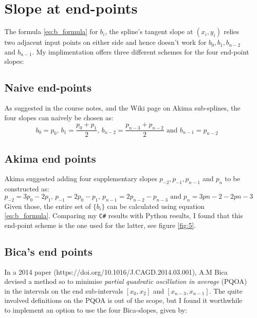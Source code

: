 \documentclass[a4paper]{article}
\begin{document}
\section{Slope at end-points}
The formula \ref{eq:b_formula} for $b_i$, the spline's tangent slope at $(x_i,y_i)$ relies two adjacent input points on either side and hence doesn't work for $b_0, b_1, b_{n-2}$ and $b_{n-1}$. My implimentation offers three different schemes for the four end-point slopes:

\subsection{Naive end-points}
As suggested in the course notes, and the Wiki page on Akima sub-splines, the four slopes can naively be chosen as:
\begin{equation}
    b_0 = p_0,\,b_1 = \frac{p_0 + p_1}{2},\,b_{n-2} = \frac{p_{n-3} + p_{n-2}}{2} \text{ and } b_{n-1} = p_{n-2}
\end{equation}

\subsection{Akima end points}
Akima suggested adding four supplementary slopes $p_{-2}, p_{-1}, p_{n-1}$ and $p_{n}$ to be constructed as:
\begin{equation}
    p_{-2} = 3p_0-2p_1,\, p_{-1} = 2p_0-p_1,\, p_{n-1} = 2p_{n-2} - p_{n-3} \text{ and } p_{n} = 3p{n-2} - 2p{n-3}
\end{equation}
Given those, the entire set of $\{b_i\}$ can be calculated using equation \ref{eq:b_formula}. Comparing my \texttt{C\#} results with Python results, I found that this end-point scheme is the one used for the latter, see figure \ref{fig:5}.

\subsection{Bica's end points}
In a 2014 paper (https://doi.org/10.1016/J.CAGD.2014.03.001), A.M Bica devised a method so to minimise \emph{partial quadratic oscillation in average} (PQOA) in the intervals on the end sub-intervals $[x_0,x_2]$ and $[x_{n-3},x_{n-1}]$. The quite involved definitions on the PQOA is out of the scope, but I found it worthwhile to implement an option to use the four Bica-slopes, given by:
\end{document}
